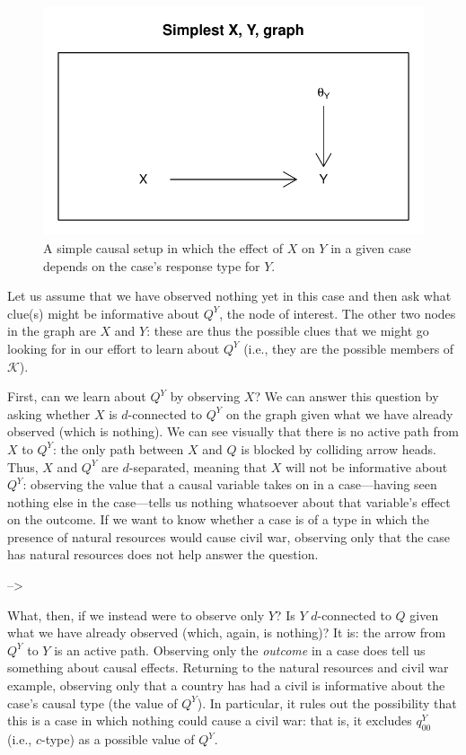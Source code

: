 \documentclass[12pt,]{book}
\begin{document}
\begin{figure}

{\centering \includegraphics[width=.5\textwidth]{ii_files/figure-latex/unnamed-chunk-37-1} 

}

\caption{\label{fig:d-sepsimple} A simple causal setup in which the effect of $X$ on $Y$ in a given case depends on the case's response type for $Y$.}\label{fig:unnamed-chunk-37}
\end{figure}

Let us assume that we have observed nothing yet in this case and then ask what clue(s) might be informative about \(Q^Y\), the node of interest. The other two nodes in the graph are \(X\) and \(Y\): these are thus the possible clues that we might go looking for in our effort to learn about \(Q^Y\) (i.e., they are the possible members of \(\mathcal K\)).

First, can we learn about \(Q^Y\) by observing \(X\)? We can answer this question by asking whether \(X\) is \(d\)-connected to \(Q^Y\) on the graph given what we have already observed (which is nothing). We can see visually that there is no active path from \(X\) to \(Q^Y\): the only path between \(X\) and \(Q\) is blocked by colliding arrow heads. Thus, \(X\) and \(Q^Y\) are \(d\)-separated, meaning that \(X\) will not be informative about \(Q^Y\): observing the value that a causal variable takes on in a case---having seen nothing else in the case---tells us nothing whatsoever about that variable's effect on the outcome. If we want to know whether a case is of a type in which the presence of natural resources would cause civil war, observing only that the case has natural resources does not help answer the question.

--\textgreater{}

What, then, if we instead were to observe only \(Y\)? Is \(Y\) \(d\)-connected to \(Q\) given what we have already observed (which, again, is nothing)? It is: the arrow from \(Q^Y\) to \(Y\) is an active path. Observing only the \emph{outcome} in a case does tell us something about causal effects. Returning to the natural resources and civil war example, observing only that a country has had a civil is informative about the case's causal type (the value of \(Q^Y\)). In particular, it rules out the possibility that this is a case in which nothing could cause a civil war: that is, it excludes \(q^Y_{00}\) (i.e., \(c\)-type) as a possible value of \(Q^Y\).
\end{document}
